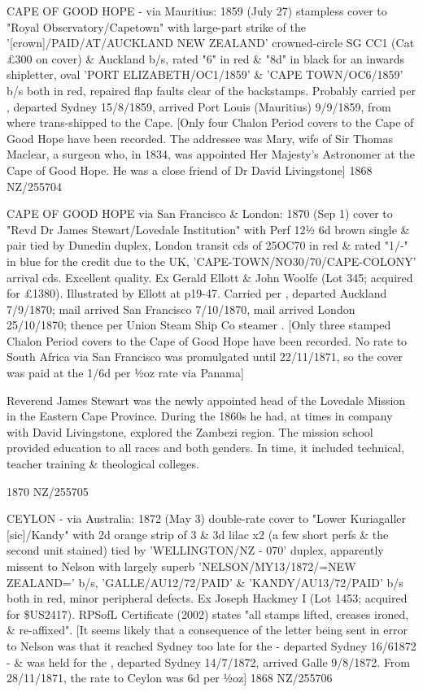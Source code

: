 \documentclass[justified]{tufte-book}
\begin{document}
%
{CAPE OF GOOD HOPE - via Mauritius: 1859 (July 27) stampless cover to "Royal Observatory/Capetown" with large-part strike of the '[crown]/PAID/AT/AUCKLAND NEW ZEALAND' crowned-circle SG CC1 (Cat £300 on cover) \& Auckland b/s, rated "6" in red \& "8d" in black for an inwards shipletter, oval 'PORT ELIZABETH/OC1/1859' \& 'CAPE TOWN/OC6/1859' b/s both in red, repaired flap faults clear of the backstamps. Probably carried per , departed Sydney 15/8/1859, arrived Port Louis (Mauritius) 9/9/1859, from where trans-shipped to the Cape. [Only four Chalon Period covers to the Cape of Good Hope have been recorded. The addressee was Mary, wife of Sir Thomas Maclear, a surgeon who, in 1834, was appointed Her Majesty's Astronomer at the Cape of Good Hope. He was a close friend of Dr David Livingstone]}%
{1868}%
{NZ/255704}%
{}%
{}
{}%
{}

%
{CAPE OF GOOD HOPE via San Francisco \& London: 1870 (Sep 1) cover to "Revd Dr James Stewart/Lovedale Institution" with Perf 12½ 6d brown single \& pair tied by Dunedin duplex, London transit cds of 25OC70 in red \& rated "1/-" in blue for the credit due to the UK, 'CAPE-TOWN/NO30/70/CAPE-COLONY' arrival cds. Excellent quality. Ex Gerald Ellott \& John Woolfe (Lot 345; acquired for \pounds{1380}). Illustrated by Ellott at p19-47. Carried per , departed Auckland 7/9/1870; mail arrived San Francisco 7/10/1870, mail arrived London 25/10/1870; thence per Union Steam Ship Co steamer . [Only three stamped Chalon Period covers to the Cape of Good Hope have been recorded. No rate to South Africa via San Francisco was promulgated until 22/11/1871, so the cover was paid at the 1/6d per ½oz rate via Panama] 

Reverend James Stewart was the newly appointed head of the Lovedale Mission in the Eastern Cape Province. During the 1860s he had, at times in company with David Livingstone, explored the Zambezi region. The mission school provided education to all races and both genders. In time, it included technical, teacher training \& theological colleges.}%
{1870}%
{NZ/255705}%
{}%
{}
{}%
{}

%
{CEYLON - via Australia: 1872 (May 3) double-rate cover to "Lower Kuriagaller [sic]/Kandy" with 2d orange strip of 3 \& 3d lilac x2 (a few short perfs \& the second unit stained) tied by 'WELLINGTON/NZ - 070' duplex, apparently missent to Nelson with largely superb 'NELSON/MY13/1872/=NEW ZEALAND=' b/s, 'GALLE/AU12/72/PAID' \& 'KANDY/AU13/72/PAID' b/s both in red, minor peripheral defects. Ex Joseph Hackmey I (Lot 1453; acquired for \$US2417). RPSofL Certificate (2002) states "all stamps lifted, creases ironed, \& re-affixed". [It seems likely that a consequence of the letter being sent in error to Nelson was that it reached Sydney too late for the  - departed Sydney 16/61872 - \& was held for the , departed Sydney 14/7/1872, arrived Galle 9/8/1872. From 28/11/1871, the rate to Ceylon was 6d per ½oz]}%
{1868}%
{NZ/255706}%
{}%
{}
{}%
{}
\end{document}
